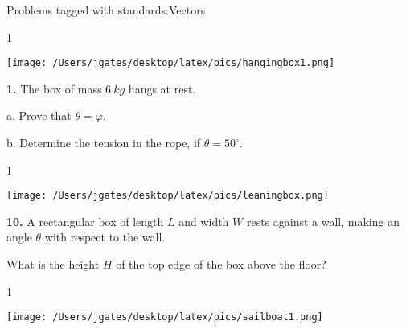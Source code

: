 

{\Large Problems tagged with standards:}Vectors
\bigskip 

\AddToShipoutPicture*{\BackgroundPic}

\addtocounter {ProbNum} {1}

\begin{floatingfigure}[r]{.2\textwidth}
\texttt{[image: /Users/jgates/desktop/latex/pics/hangingbox1.png]}
\end{floatingfigure}
 
{\bf \Large{1.}} The box of mass ${6~kg}$ hangs at rest. 

\bigskip

\indent  a. Prove that ${\theta = \varphi}$.

\bigskip
b. Determine the tension in the rope, if ${\theta = 50^\circ}$.

\bigskip
\vspace{20mm}%

\AddToShipoutPicture*{\BackgroundPic}

\addtocounter {ProbNum} {1}

\begin{floatingfigure}[r]{.3\textwidth}
\texttt{[image: /Users/jgates/desktop/latex/pics/leaningbox.png]}
\end{floatingfigure}
 
{\bf \Large{10.}} A rectangular box of length $L$ and width $W$ rests against a wall, making an angle $\theta$ with respect to the wall.  

\bigskip

\indent What is the height $H$ of the top edge of the box above the floor?

\bigskip
\vspace{20mm}%

\AddToShipoutPicture*{\BackgroundPic}

\addtocounter {ProbNum} {1}

\begin{floatingfigure}[r]{.35\textwidth}
\texttt{[image: /Users/jgates/desktop/latex/pics/sailboat1.png]}
\end{floatingfigure}
 
